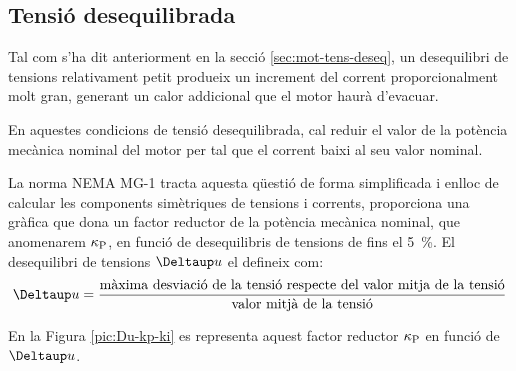 \subsection{Tensió desequilibrada}\label{sec:NEMA-U-deseq}

Tal com s'ha dit anteriorment en la secció \ref{sec:mot-tens-deseq}, un desequilibri de tensions relativament petit produeix un increment del corrent proporcionalment molt gran, generant un  calor addicional que el motor haurà d'evacuar.

En aquestes condicions de tensió desequilibrada, cal reduir el valor de la potència mecànica nominal del motor per tal que el corrent baixi al seu valor nominal.

La norma NEMA MG-1 tracta aquesta qüestió de forma simplificada i enlloc de calcular les components simètriques de tensions i corrents, proporciona una gràfica que dona un factor reductor de la potència mecànica nominal, que anomenarem $\kappa_\mathrm{P}$, en funció de desequilibris de tensions de fins el \SI{5}{\%}. El desequilibri de tensions $\Deltaup u$ el defineix com:
\[
    \Deltaup u = \frac{\text{màxima desviació de la tensió respecte del valor mitja de la tensió}}{\text{valor mitjà de la tensió}}
\]

En la Figura \vref{pic:Du-kp-ki} es representa aquest factor reductor $\kappa_\mathrm{P}$ en funció de $\Deltaup u$.

\begin{center}
    
    \label{pic:Du-kp-ki}
\end{center}


